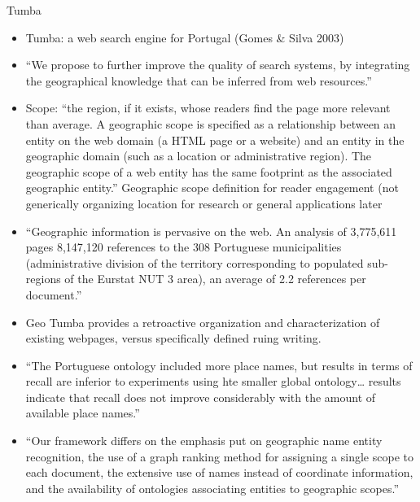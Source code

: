 Tumba
\begin{itemize}
	\item {\color{orange} Tumba: a web search engine for Portugal (Gomes \& Silva 2003)\cite{Silva2006}}
	\item {\color{orange} “We propose to further improve the quality of search systems, by integrating the geographical knowledge that can be inferred from web resources.”\cite{Silva2006}}
	\item {\color{orange}Scope: “the region, if it exists, whose readers find the page more relevant than average. A geographic scope is specified as a relationship between an entity on the web domain (a HTML page or a website) and an entity in the geographic domain (such as a location or administrative region). The geographic scope of a web entity has the same footprint as the associated geographic entity.” Geographic scope definition for reader engagement (not generically organizing location for research or general applications later\cite{Silva2006}}
	\item {\color{orange}“Geographic information is pervasive on the web. An analysis of 3,775,611 pages 8,147,120 references to the 308 Portuguese municipalities (administrative division of the territory corresponding to populated sub-regions of the Eurstat NUT 3 area), an average of 2.2 references per document.”\cite{Silva2006}}
	\item {\color{purple}Geo Tumba provides a retroactive organization and characterization of existing webpages, versus specifically defined ruing writing.\cite{Silva2006}}	
	\item {\color{orange}“The Portuguese ontology included more place names, but results in terms of recall are inferior to experiments using hte smaller global ontology… results indicate that recall does not improve considerably with the amount of available place names.”\cite{Silva2006}}
	\item {\color{orange}“Our framework differs on the emphasis put on geographic name entity recognition, the use of a graph ranking method for assigning a single scope to each document, the extensive use of names instead of coordinate information, and the availability of ontologies associating entities to geographic scopes.”\cite{Silva2006}}
\end{itemize}

